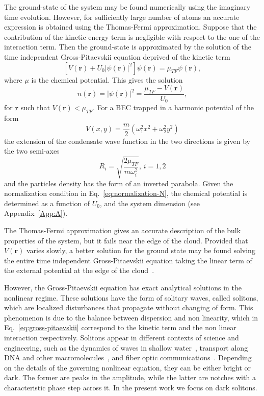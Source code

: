The ground-state of the system may be found numerically using the imaginary time evolution. However, for sufficiently large number of atoms an accurate expression is obtained using the Thomas-Fermi approximation. Suppose that the contribution of the kinetic energy term is negligible with respect to the one of the interaction term. Then the ground-state is approximated by the solution of the time independent Gross-Pitaevskii equation deprived of the kinetic term
\begin{equation}
\left[ V(\textbf{r}) + U_0 |\psi(\textbf{r})|^2 \right] \psi(\textbf{r}) = \mu_{TF} \psi(\textbf{r}),
\end{equation}
where $\mu$ is the chemical potential. This gives the solution
\begin{equation}
n(\textbf{r}) = |\psi(\textbf{r})|^2 = \frac{\mu_{TF} - V(\textbf{r})}{U_0},
\end{equation}
for $\textbf{r}$ such that $V(\textbf{r}) < \mu_{TF}$. 
For a BEC trapped in a harmonic potential of the form
\begin{equation}
V(x,y) = \frac{m}{2} (\omega_1^2 x^2 + \omega_2^2 y^2)
\end{equation}
the extension of the condensate wave function in the two directions is given by the two semi-axes
\begin{equation} \label{eq:TF-radius}
R_i = \sqrt{\frac{2\mu_{TF}}{m\omega_i^2}}, \, i = 1,2
\end{equation}
and the particles density has the form of an inverted parabola. Given the normalization condition in Eq.~\eqref{eq:normalization-N}, the chemical potential is determined as a function of $U_0$, and the system dimension (see Appendix~\ref{App:A}).

The Thomas-Fermi approximation gives an accurate description of the bulk properties of the system, but it fails near the edge of the cloud. Provided that $V(\textbf{r})$ varies slowly, a better solution for the ground state may be found solving the entire time independent Gross-Pitaevskii equation taking the linear term of the external potential at the edge of the cloud~\citep{pethick2002bose}.

However, the Gross-Pitaevskii equation has exact analytical solutions in the nonlinear regime. These solutions have the form of solitary waves, called solitons, which are localized disturbances that propagate without changing of form. This phenomenon is due to the balance between dispersion and non linearity, which in Eq.~\eqref{eq:gross-pitaevskii} correspond to the kinetic term and the non linear interaction respectively. Solitons appear in different contexts of science and engineering, such as the dynamics of waves in shallow water~\citep{B88}, transport along DNA and other macromolecules~\citep{P95}, and fiber optic communications~\citep{H90}.
Depending on the details of the governing nonlinear equation, they can be either bright or dark. The former are peaks in the amplitude, while the latter are notches with a characteristic phase step across it. In the present work we focus on dark solitons. 

